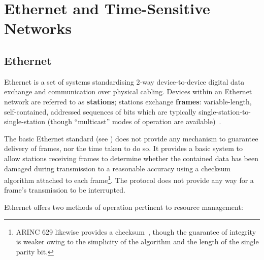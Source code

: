 \section{Ethernet and Time-Sensitive Networks}

\subsection{Ethernet}

%

Ethernet is a set of systems standardising 2-way device-to-device digital data exchange and communication over physical cabling.
Devices within an Ethernet network are referred to as \textbf{stations}; stations exchange \textbf{frames}: variable-length, self-contained, addressed sequences of bits which are typically single-station-to-single-station (though ``multicast'' modes of operation are available)~\cite{IEEEStandardEthernet2022}\cite{spurgeonEthernetDefinitiveGuide2000}.

The basic Ethernet standard (see \cite{IEEEStandardEthernet2022}) does not provide any mechanism to guarantee delivery of frames, nor the time taken to do so.
It provides a basic system to allow stations receiving frames to determine whether the contained data has been damaged during transmission to a reasonable accuracy using a checksum algorithm attached to each frame\footnote{ARINC 629 likewise provides a checksum~\cite{dheerajpuniaARINC629Digital2021}, though the guarantee of integrity is weaker owing to the simplicity of the algorithm and the length of the single parity bit.}.
The protocol does not provide any way for a frame's transmission to be interrupted.

Ethernet offers two methods of operation pertinent to resource management:

